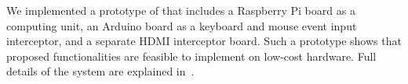

We implemented a prototype of \protection that includes a Raspberry Pi board as a computing unit, an Arduino board as a keyboard and mouse event input interceptor, and a separate HDMI interceptor board. Such a prototype shows that proposed functionalities are feasible to implement on low-cost hardware. Full details of the \protection system are explained in~\cite{protection}.


